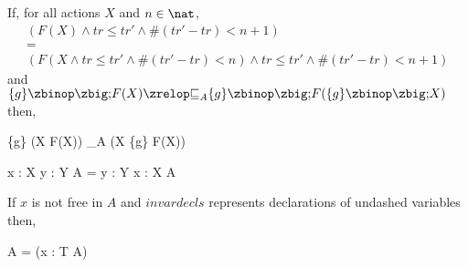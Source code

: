 \begin{law}
  \label{assump-rec-distl-law}
  If, for all actions $X$ and $n \in \nat$,
  \[\begin{array}{l}
      (F(X) \land tr \leq tr' \land \# (tr'-tr) < n + 1) \\
      {} = {} \\
      (F(X \land tr \leq tr' \land \# (tr'-tr) < n) \land tr \leq tr' \land \# (tr'-tr) < n + 1)
    \end{array}\]
  and $\{g\} \circseq F(X) \circrefines_A \{g\} \circseq F(\{g\} \circseq X)$ then,
  \begin{circus}
    \{g\} \circseq (\circmu X \circspot F(X))
    \circrefines_A
    (\circmu X \circspot \{g\} \circseq F(X))
  \end{circus}
\end{law}

\begin{law}
  \label{var-var-comm-law}
  \begin{circus}
    \circvar x : X \circspot \circvar y : Y \circspot A = \circvar y : Y \circspot \circvar x : X \circspot A
  \end{circus}
\end{law}


\begin{law}
  \label{var-schema-intro-law}
  If $x$ is not free in $A$ and $invardecls$ represents declarations
  of undashed variables then,
  \begin{circus}
    A = (\circvar x : T \circspot {} \rschexpract \circseq A)
  \end{circus}
\end{law}

